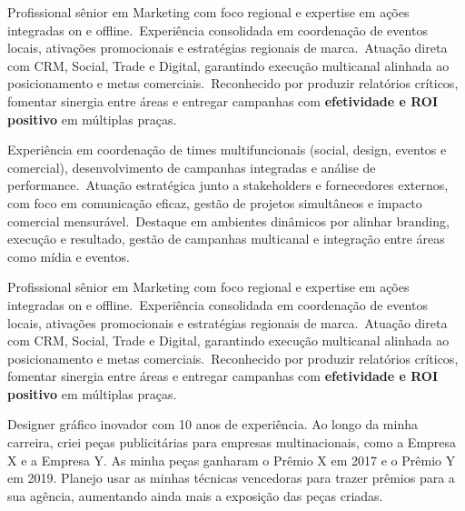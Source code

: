 \begin{commentA}
  Profissional sênior em Marketing com foco regional e expertise em ações integradas on e offline.\
Experiência consolidada em coordenação de eventos locais, ativações promocionais e estratégias regionais de marca.\
Atuação direta com CRM, Social, Trade e Digital, garantindo execução multicanal alinhada ao posicionamento e metas comerciais.\
Reconhecido por produzir relatórios críticos, fomentar sinergia entre áreas e entregar campanhas com \textbf{efetividade e ROI positivo} em múltiplas praças.
\end{commentA}
\begin{commentB}
  Experiência em coordenação de times multifuncionais (social, design, eventos e comercial), desenvolvimento de campanhas integradas e análise de performance.\
  Atuação estratégica junto a stakeholders e fornecedores externos, com foco em comunicação eficaz, gestão de projetos simultâneos e impacto comercial mensurável.\
  Destaque em ambientes dinâmicos por alinhar branding, execução e resultado, gestão de campanhas multicanal e integração entre áreas como mídia e eventos.
\end{commentB}
\begin{commentC}
  Profissional sênior em Marketing com foco regional e expertise em ações integradas on e offline.\
Experiência consolidada em coordenação de eventos locais, ativações promocionais e estratégias regionais de marca.\
Atuação direta com CRM, Social, Trade e Digital, garantindo execução multicanal alinhada ao posicionamento e metas comerciais.\
Reconhecido por produzir relatórios críticos, fomentar sinergia entre áreas e entregar campanhas com \textbf{efetividade e ROI positivo} em múltiplas praças.
\end{commentC}
\begin{commentD}
  Designer gráfico inovador com 10 anos de experiência. Ao longo da minha carreira, criei peças publicitárias para empresas multinacionais, como a Empresa X e a Empresa Y. As minha peças ganharam o Prêmio X em 2017 e o Prêmio Y em 2019. Planejo usar as minhas técnicas vencedoras para trazer prêmios para a sua agência, aumentando ainda mais a exposição das peças criadas.
\end{commentD}

